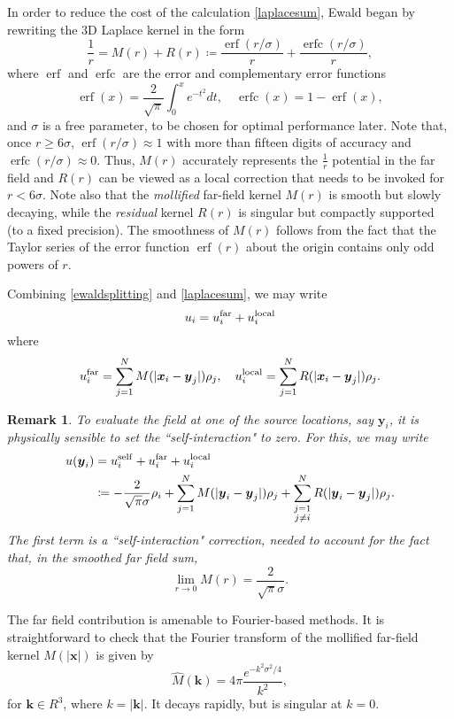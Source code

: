 \documentclass[final,letterpaper]{siamart171218}
\newtheorem{remark}[theorem]{Remark}
\DeclareMathOperator\erf{erf}
\DeclareMathOperator\erfc{erfc}
\newcommand{\be}{\begin{equation}}
\newcommand{\ee}{\end{equation}}
\newcommand{\ba}{\begin{aligned}}
\newcommand{\ea}{\end{aligned}}
\newcommand{\x}{\boldsymbol{x}}
\newcommand{\y}{\boldsymbol{y}}
\newcommand{\bk}{\boldsymbol{k}}
\begin{document}
In order to reduce the cost of the calculation \eqref{laplacesum},
Ewald \cite{ewald1921ap} began by rewriting
the 3D Laplace kernel in the form
\be\label{ewaldsplitting}
\frac{1}{r} = M(r)+R(r)\coloneqq \frac{\erf({r}/\sigma)}{r}
+ \frac{\erfc({r}/\sigma)}{r},
\ee
where $\erf$ and $\erfc$ are the error and complementary error functions
\be\label{erfdef}
\erf(x)=\frac{2}{\sqrt{\pi}}\int_0^x e^{-t^2}dt, \quad \erfc(x)=1-\erf(x),
\ee
and $\sigma$ is a free parameter, to be chosen for optimal performance later.
Note that, once $r \geq 6 \sigma$, $\erf({r}/\sigma) \approx 1$ with more than
fifteen digits of accuracy and 
$\erfc({r}/\sigma) \approx 0$.
Thus, $M(r)$ accurately represents the 
$\frac{1}{r}$ potential in the far field and $R(r)$
can be viewed as a local correction that needs to be invoked for 
$r < 6 \sigma$. 
Note also that 
the {\em mollified} far-field kernel $M(r)$ is smooth 
but slowly decaying, while
the {\em residual} kernel $R(r)$ is singular but compactly supported (to a fixed
precision).
The smoothness of $M(r)$ 
follows from the fact that the Taylor series of 
the error function $\erf(r)$ about the origin contains only odd
powers of $r$. 

Combining \cref{ewaldsplitting} and \cref{laplacesum}, we may write
\be\label{laplacesum2}
u_i= u_{i}^{\rm far}+u_{i}^{\rm local}\\
\ee
where
\[
u_{i}^{\rm far} = \sum_{j=1}^{N}M(|\x_i-\y_j|)\rho_j, \quad
u_{i}^{\rm local} = \sum_{j=1}^{N}R(|\x_i-\y_j|)\rho_j.
\]

\begin{remark}
To evaluate the field at one of the source locations, 
say $\y_{i}$,
it is physically sensible to set the 
``self-interaction" to zero. For this, we  may write
\be\label{laplacesum2self}
\ba
u(\y_{i}) &= u_{i}^{\rm self}+u_{i}^{\rm far}+u_{i}^{\rm local}\\
&\coloneqq -\frac{2}{\sqrt{\pi} \sigma}\rho_i +
\sum_{j=1}^{N}M(|\y_i-\y_j|)\rho_j + 
\sum_{\substack{j=1 \\ j\ne i}}^{N}R(|\y_i-\y_j|)\rho_j.
\ea
\ee
The first term is a ``self-interaction" correction, needed to account for
the fact that, in the smoothed far field sum,
\be
\lim_{r\rightarrow 0} M(r) = \frac{2}{\sqrt{\pi} \sigma}.
\ee
\end{remark}

The far field contribution is amenable to Fourier-based methods. 
It is straightforward to check that the Fourier
transform of the mollified far-field kernel $M(|\x|)$ is
given by
\be\label{erfoverrft}
\widehat{M}(\bk) = 4\pi \frac{e^{-k^2\sigma^2/4}}{k^2},
\ee
for $\bk \in R^3$, where $k = |\bk|$. It decays rapidly, but is 
singular at $k=0$.
\end{document}
